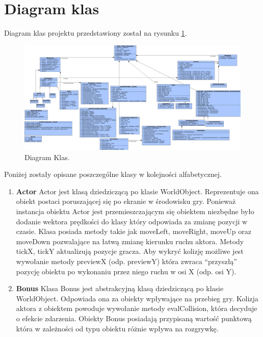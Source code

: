 \section{Diagram klas}
\begin{par}
	\begin{par}
	Diagram klas projektu przedstawiony został na rysunku \ref{fig:diagram_klas}.
	\end{par}
	\begin{figure}[!h]
	\centering
	\includegraphics[height=\textheight]{obrazki/diagram_klas.png}
	\caption{Diagram Klas.}
	\label{fig:diagram_klas}
	\end{figure}
	Poniżej zostały opisane poszczególne klasy w kolejności alfabetycznej.
	\begin{enumerate}
	\item{\bf Actor }\newline
	Actor jest klasą dziedziczącą po klasie WorldObject. Reprezentuje ona obiekt postaci poruszającej się po ekranie w środowisku gry. Ponieważ instancja obiektu Actor jest przemieszczającym się obiektem niezbędne było dodanie wektora prędkości do klasy który odpowiada za zmianę pozycji w czasie. Klasa posiada metody takie jak moveLeft, moveRight, moveUp oraz moveDown pozwalające na łatwą zmianę kierunku ruchu aktora. Metody tickX, tickY aktualizują pozycje gracza. Aby wykryć kolizję możliwe jest wywołanie metody previewX (odp. previewY) która zwraca ``przyszłą'' pozycję obiektu po wykonaniu przez niego ruchu w osi X (odp. osi Y).
	\item{\bf Bonus }\newline
	Klasa Bonus jest abstrakcyjną klasą dziedziczącą po klasie WorldObject. Odpowiada ona za obiekty wpływające na przebieg gry. Kolizja aktora z obiektem powoduje wywołanie metody evalCollision, która decyduje o efekcie zdarzenia. Obiekty Bonus posiadają przypisaną wartość punktową która w zależności od typu obiektu różnie wpływa na rozgrywkę.

\end{enumerate}
\end{par}
